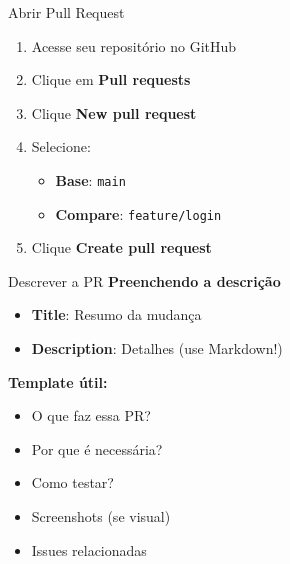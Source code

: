 \documentclass[11pt]{beamer}
\begin{document}
\begin{frame}{Abrir Pull Request}
\begin{enumerate}
    \item Acesse seu repositório no GitHub
    \item Clique em \textbf{Pull requests}
    \item Clique \textbf{New pull request}
    \item Selecione:
    \begin{itemize}
        \item \textbf{Base}: \texttt{main}
        \item \textbf{Compare}: \texttt{feature/login}
    \end{itemize}
    \item Clique \textbf{Create pull request}
\end{enumerate}
\end{frame}

\begin{frame}{Descrever a PR}
\textbf{Preenchendo a descrição}

\begin{itemize}
    \item \textbf{Title}: Resumo da mudança
    \item \textbf{Description}: Detalhes (use Markdown!)
\end{itemize}

\vspace{0.3cm}

\textbf{Template útil:}

\begin{itemize}
    \small
    \item O que faz essa PR?
    \item Por que é necessária?
    \item Como testar?
    \item Screenshots (se visual)
    \item Issues relacionadas
\end{itemize}
\end{frame}
\end{document}
